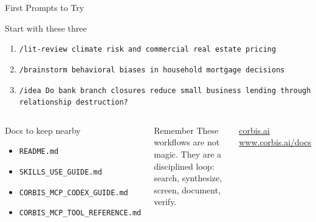 \documentclass[aspectratio=169,professionalfonts]{beamer}
\begin{document}
\begin{frame}[t]{First Prompts to Try}
\footnotesize
\begin{block}{Start with these three}
\begin{enumerate}
  \item {\scriptsize\texttt{/lit-review climate risk and commercial real estate pricing}}
  \item {\scriptsize\texttt{/brainstorm behavioral biases in household mortgage decisions}}
  \item {\scriptsize\texttt{/idea Do bank branch closures reduce small business lending through relationship destruction?}}
\end{enumerate}
\end{block}
\begin{columns}[T,onlytextwidth]
\begin{block}{Docs to keep nearby}
\begin{itemize}
  \item \texttt{README.md}
  \item \texttt{SKILLS\_USE\_GUIDE.md}
  \item \texttt{CORBIS\_MCP\_CODEX\_GUIDE.md}
  \item \texttt{CORBIS\_MCP\_TOOL\_REFERENCE.md}
\end{itemize}
\end{block}
\begin{block}{Remember}
These workflows are not magic. They are a disciplined loop: search, synthesize, screen, document, verify.
\end{block}
\vspace{0.5em}
{\footnotesize
\href{https://www.corbis.ai}{corbis.ai} \hspace{1em}
\href{https://www.corbis.ai/docs}{www.corbis.ai/docs}
}
\end{columns}
\end{frame}
\end{document}
